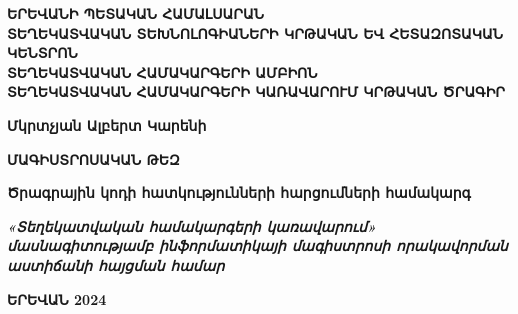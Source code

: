 \begin{titlepage}
    \begin{center}
        \vspace{0.6cm}
        \Large
        \textbf{ԵՐԵՎԱՆԻ ՊԵՏԱԿԱՆ ՀԱՄԱԼՍԱՐԱՆ}\\
        \vspace{1.5cm}
        \textbf{ՏԵՂԵԿԱՏՎԱԿԱՆ ՏԵԽՆՈԼՈԳԻԱՆԵՐԻ ԿՐԹԱԿԱՆ ԵՎ ՀԵՏԱԶՈՏԱԿԱՆ ԿԵՆՏՐՈՆ}\\
        
        \vspace{1cm}
        \textbf{ՏԵՂԵԿԱՏՎԱԿԱՆ ՀԱՄԱԿԱՐԳԵՐԻ ԱՄԲԻՈՆ}\\ 
        \vspace{1cm}
        \textbf{ՏԵՂԵԿԱՏՎԱԿԱՆ ՀԱՄԱԿԱՐԳԵՐԻ ԿԱՌԱՎԱՐՈՒՄ ԿՐԹԱԿԱՆ ԾՐԱԳԻՐ}
                
        \vspace{1.5cm}
        \textbf{Մկրտչյան Ալբերտ Կարենի}
        
        \vspace{2cm}
        \textbf{ՄԱԳԻՍՏՐՈՍԱԿԱՆ ԹԵԶ}
        
        \vspace{1cm}
        \textbf{Ծրագրային կոդի հատկությունների հարցումների համակարգ}

        \vfill
           
        \textbf{\textit{«Տեղեկատվական համակարգերի կառավարում» մասնագիտությամբ ինֆորմատիկայի մագիստրոսի որակավորման աստիճանի հայցման համար}}

        \vspace{0.8cm}

        \textbf{ԵՐԵՎԱՆ 2024}
    \end{center}
\end{titlepage}